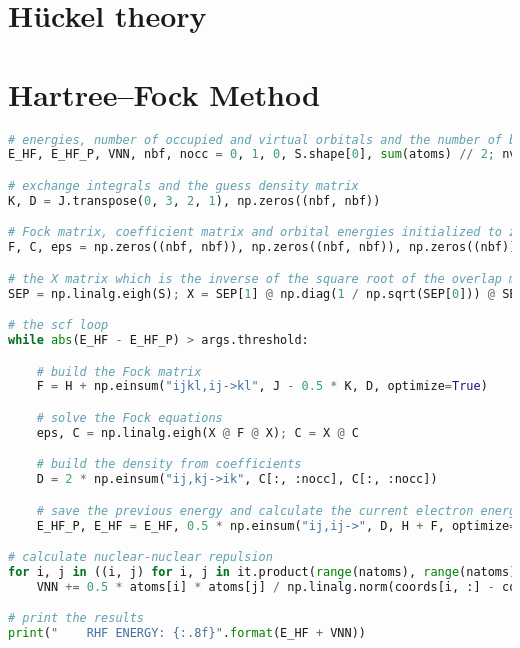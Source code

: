 \section*{Hückel theory}

\lstset{style=mystyle}


\section*{\texorpdfstring{Hartree--Fock Method\label{sec:hf_code_solution}}{Hartree--Fock Method}}

\raggedbottom\begin{lstlisting}[language=Python, caption={\acrshort{hf} method exercise code solution.}, label=code:hf_solution]
# energies, number of occupied and virtual orbitals and the number of basis functions
E_HF, E_HF_P, VNN, nbf, nocc = 0, 1, 0, S.shape[0], sum(atoms) // 2; nvirt = nbf - nocc

# exchange integrals and the guess density matrix
K, D = J.transpose(0, 3, 2, 1), np.zeros((nbf, nbf))

# Fock matrix, coefficient matrix and orbital energies initialized to zero
F, C, eps = np.zeros((nbf, nbf)), np.zeros((nbf, nbf)), np.zeros((nbf))

# the X matrix which is the inverse of the square root of the overlap matrix
SEP = np.linalg.eigh(S); X = SEP[1] @ np.diag(1 / np.sqrt(SEP[0])) @ SEP[1].T

# the scf loop
while abs(E_HF - E_HF_P) > args.threshold:

    # build the Fock matrix
    F = H + np.einsum("ijkl,ij->kl", J - 0.5 * K, D, optimize=True)

    # solve the Fock equations
    eps, C = np.linalg.eigh(X @ F @ X); C = X @ C

    # build the density from coefficients
    D = 2 * np.einsum("ij,kj->ik", C[:, :nocc], C[:, :nocc])

    # save the previous energy and calculate the current electron energy
    E_HF_P, E_HF = E_HF, 0.5 * np.einsum("ij,ij->", D, H + F, optimize=True)

# calculate nuclear-nuclear repulsion
for i, j in ((i, j) for i, j in it.product(range(natoms), range(natoms)) if i != j):
    VNN += 0.5 * atoms[i] * atoms[j] / np.linalg.norm(coords[i, :] - coords[j, :])

# print the results
print("    RHF ENERGY: {:.8f}".format(E_HF + VNN))
\end{lstlisting}


